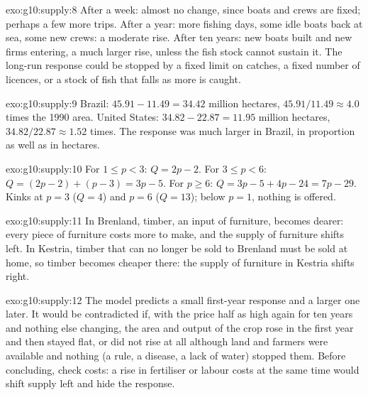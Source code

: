 \begin{solution}{exo:g10:supply:8}
After a week: almost no change, since boats and crews are fixed; perhaps a few more trips. After a year: more fishing days, some idle boats back at
sea, some new crews: a moderate rise. After ten years: new boats built and new firms entering, a much larger rise, unless the fish stock cannot
sustain it. The long-run response could be stopped by a fixed limit on catches, a fixed number of licences, or a stock of fish that falls as more
is caught.
\end{solution}

\begin{solution}{exo:g10:supply:9}
Brazil: $45.91 - 11.49 = 34.42$ million hectares, $45.91/11.49 \approx 4.0$ times the 1990 area. United States: $34.82 - 22.87 = 11.95$ million
hectares, $34.82/22.87 \approx 1.52$ times. The response was much larger in Brazil, in proportion as well as in hectares.
\end{solution}

\begin{solution}{exo:g10:supply:10}
For $1 \le p < 3$: $Q = 2p - 2$. For $3 \le p < 6$: $Q = (2p - 2) + (p - 3) = 3p - 5$. For $p \ge 6$: $Q = 3p - 5 + 4p - 24 = 7p - 29$. Kinks at $p = 3$
($Q = 4$) and $p = 6$ ($Q = 13$); below $p = 1$, nothing is offered.
\end{solution}

\begin{solution}{exo:g10:supply:11}
In Brenland, timber, an input of furniture, becomes dearer: every piece of furniture costs more to make, and the supply of furniture shifts left. In
Kestria, timber that can no longer be sold to Brenland must be sold at home, so timber becomes cheaper there: the supply of furniture in Kestria
shifts right.
\end{solution}

\begin{solution}{exo:g10:supply:12}
The model predicts a small first-year response and a larger one later. It would be contradicted if, with the price half as high again for ten
years and nothing else changing, the area and output of the crop rose in the first year and then stayed flat, or did not rise at all although land
and farmers were available and nothing (a rule, a disease, a lack of water) stopped them. Before concluding, check costs: a rise in fertiliser or
labour costs at the same time would shift supply left and hide the response.
\end{solution}

